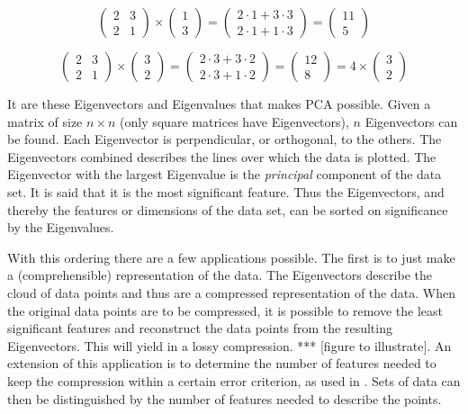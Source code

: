 \begin{equation}
	\label{eq:no-eigenvector}
	\begin{pmatrix} 2 & 3 \\ 2 & 1 \end{pmatrix}
	\times
	\begin{pmatrix} 1 \\ 3 \end{pmatrix}
	=
	\begin{pmatrix} 2 \cdot 1 + 3 \cdot 3 \\ 2 \cdot 1 + 1 \cdot 3
	\end{pmatrix}
	=
	\begin{pmatrix} 11 \\ 5 \end{pmatrix}
\end{equation}

\begin{equation}
	\label{eq:eigenvector}
	\begin{pmatrix} 2 & 3 \\ 2 & 1 \end{pmatrix}
	\times
	\begin{pmatrix} 3 \\ 2 \end{pmatrix}
	=
	\begin{pmatrix} 2 \cdot 3 + 3 \cdot 2 \\ 2 \cdot 3 + 1 \cdot 2
	\end{pmatrix}
	=
	\begin{pmatrix} 12 \\ 8 \end{pmatrix}
	=
	4 \times \begin{pmatrix} 3 \\ 2 \end{pmatrix}
\end{equation}

 It are these Eigenvectors and Eigenvalues that makes PCA possible.
 Given a matrix of size $n \times n$ (only square matrices have Eigenvectors), $n$ Eigenvectors can be found.
 Each Eigenvector is perpendicular, or orthogonal, to the others.
 The Eigenvectors combined describes the lines over which the data is plotted.
 The Eigenvector with the largest Eigenvalue is the \emph{principal} component of the data set.
 It is said that it is the most significant feature.
 Thus the Eigenvectors, and thereby the features or dimensions of the data set, can be sorted on significance by the Eigenvalues.

With this ordering there are a few applications possible.
The first is to just make a (comprehensible) representation of the data.
The Eigenvectors describe the cloud of data points and thus are a compressed representation of the data.
When the original data points are to be compressed, it is possible to remove the least significant features and reconstruct the data points from the resulting Eigenvectors.
This will yield in a lossy compression. *** [figure to illustrate].
An extension of this application is to determine the number of features needed to keep the compression within a certain error criterion, as used in \cite{barbivc2004segmenting}.
Sets of data can then be distinguished by the number of features needed to describe the points.

